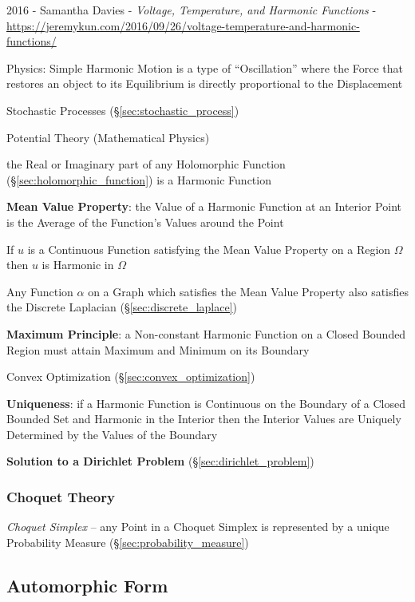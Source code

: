 2016 - Samantha Davies - \emph{Voltage, Temperature, and Harmonic
  Functions} -
\url{https://jeremykun.com/2016/09/26/voltage-temperature-and-harmonic-functions/}

Physics: Simple Harmonic Motion is a type of ``Oscillation'' where the
Force that restores an object to its Equilibrium is directly
proportional to the Displacement

Stochastic Processes (\S\ref{sec:stochastic_process})

Potential Theory (Mathematical Physics) %

the Real or Imaginary part of any Holomorphic Function
(\S\ref{sec:holomorphic_function}) is a Harmonic Function


\textbf{Mean Value Property}: the Value of a Harmonic Function at an
Interior Point is the Average of the Function's Values around the
Point

If $u$ is a Continuous Function satisfying the Mean Value Property on
a Region $\Omega$ then $u$ is Harmonic in $\Omega$

Any Function $\alpha$ on a Graph which satisfies the Mean Value
Property also satisfies the Discrete Laplacian
(\S\ref{sec:discrete_laplace})


\textbf{Maximum Principle}: a Non-constant Harmonic Function on a
Closed Bounded Region must attain Maximum and Minimum on its Boundary

Convex Optimization (\S\ref{sec:convex_optimization})


\textbf{Uniqueness}: if a Harmonic Function is Continuous on the
Boundary of a Closed Bounded Set and Harmonic in the Interior then the
Interior Values are Uniquely Determined by the Values of the Boundary


\textbf{Solution to a Dirichlet Problem}
(\S\ref{sec:dirichlet_problem})



\subsubsection{Choquet Theory}\label{sec:choquet_theory}

\emph{Choquet Simplex} -- any Point in a Choquet Simplex is represented by a
unique Probability Measure (\S\ref{sec:probability_measure})



\subsection{Automorphic Form}\label{sec:automorphic_form}

